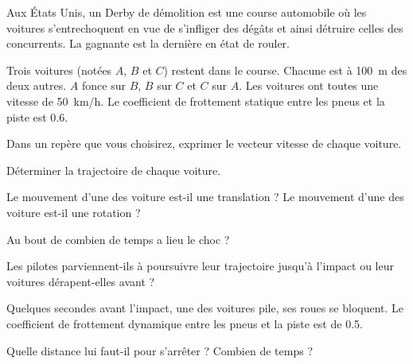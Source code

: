 

Aux États Unis, un Derby de démolition est une course automobile où les voitures s'entrechoquent en vue de s'infliger des dégâts et ainsi détruire celles des concurrents. La gagnante est la dernière en état de rouler.

Trois voitures (notées $A$, $B$ et $C$) restent dans le course. Chacune est à \SI{100}{m} des deux autres. $A$ fonce sur $B$, $B$ sur $C$ et $C$ sur $A$. Les voitures ont toutes une vitesse de \SI{50}{km/h}. Le coefficient de frottement statique entre les pneus et la piste est \SI{0.6}{}.

\question Dans un repère que vous choisirez, exprimer le vecteur vitesse de chaque voiture.

\question Déterminer la trajectoire de chaque voiture.

\question \subquestion Le mouvement d'une des voiture est-il une translation ?
\subquestion Le mouvement d'une des voiture est-il une rotation ?

\question Au bout de combien de temps a lieu le choc ?

\question Les pilotes parviennent-ils à poursuivre leur trajectoire jusqu'à l'impact ou leur voitures dérapent-elles avant ?

Quelques secondes avant l'impact, une des voitures pile, ses roues se bloquent. Le coefficient de frottement dynamique entre les pneus et la piste est de \SI{0.5}{}.

\question Quelle distance lui faut-il pour s'arrêter ? Combien de temps ?

